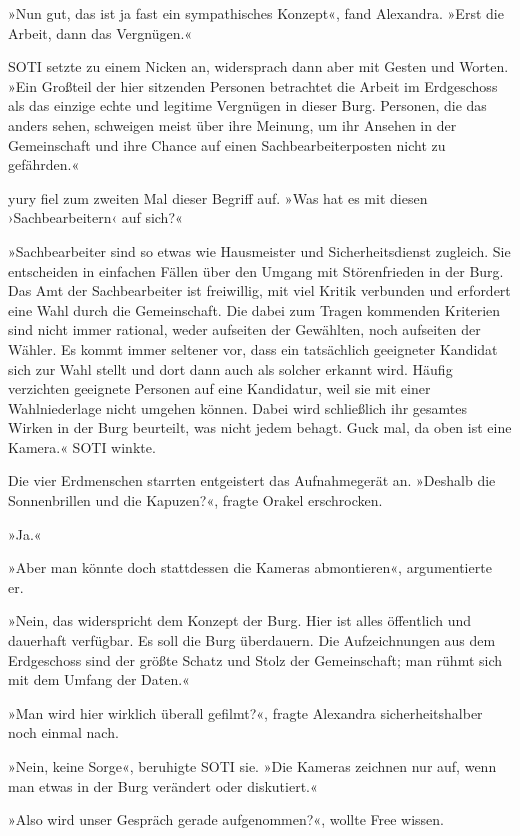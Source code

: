 »Nun gut, das ist ja fast ein sympathisches Konzept«, fand Alexandra. »Erst die Arbeit, dann das Vergnügen.«

SOTI setzte zu einem Nicken an, widersprach dann aber mit Gesten und Worten. »Ein Großteil der hier sitzenden Personen betrachtet die Arbeit im Erdgeschoss als das einzige echte und legitime Vergnügen in dieser Burg. Personen, die das anders sehen, schweigen meist über ihre Meinung, um ihr Ansehen in der Gemeinschaft und ihre Chance auf einen Sachbearbeiterposten nicht zu gefährden.«

yury fiel zum zweiten Mal dieser Begriff auf. »Was hat es mit diesen ›Sachbearbeitern‹ auf sich?«

»Sachbearbeiter sind so etwas wie Hausmeister und Sicherheitsdienst zugleich. Sie entscheiden in einfachen Fällen über den Umgang mit Störenfrieden in der Burg. Das Amt der Sachbearbeiter ist freiwillig, mit viel Kritik verbunden und erfordert eine Wahl durch die Gemeinschaft. Die dabei zum Tragen kommenden Kriterien sind nicht immer rational, weder aufseiten der Gewählten, noch aufseiten der Wähler. Es kommt immer seltener vor, dass ein tatsächlich geeigneter Kandidat sich zur Wahl stellt und dort dann auch als solcher erkannt wird. Häufig verzichten geeignete Personen auf eine Kandidatur, weil sie mit einer Wahlniederlage nicht umgehen können. Dabei wird schließlich ihr gesamtes Wirken in der Burg beurteilt, was nicht jedem behagt. Guck mal, da oben ist eine Kamera.« SOTI winkte.

Die vier Erdmenschen starrten entgeistert das Aufnahmegerät an. »Deshalb die Sonnenbrillen und die Kapuzen?«, fragte Orakel erschrocken.

»Ja.«

»Aber man könnte doch stattdessen die Kameras abmontieren«, argumentierte er.

»Nein, das widerspricht dem Konzept der Burg. Hier ist alles öffentlich und dauerhaft verfügbar. Es soll die Burg überdauern. Die Aufzeichnungen aus dem Erdgeschoss sind der größte Schatz und Stolz der Gemeinschaft; man rühmt sich mit dem Umfang der Daten.«

»Man wird hier wirklich überall gefilmt?«, fragte Alexandra sicherheitshalber noch einmal nach.

»Nein, keine Sorge«, beruhigte SOTI sie. »Die Kameras zeichnen nur auf, wenn man etwas in der Burg verändert oder diskutiert.«

»Also wird unser Gespräch gerade aufgenommen?«, wollte Free wissen.

